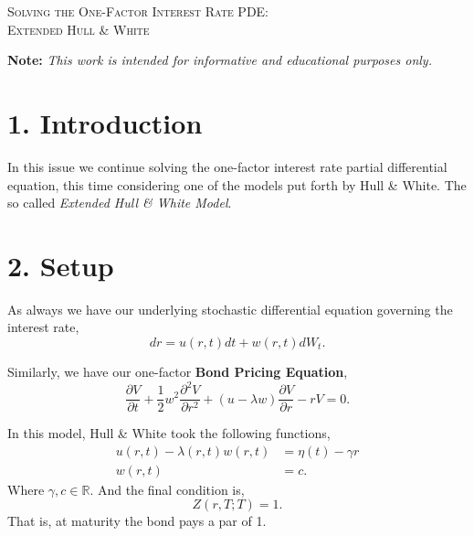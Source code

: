 \documentclass[11pt]{article}
\begin{document}

\begin{tcolorbox}
\begin{center}
    \large
    \textsc{Solving the One-Factor Interest Rate PDE: \\ Extended Hull \& White}
\end{center}
\end{tcolorbox}

\begin{center}
\textbf{Note:} \textit{This work is intended for informative and educational purposes only.}
\end{center}

\section*{1. Introduction}
In this issue we continue solving the one-factor interest rate partial differential equation, this time considering one of the models put forth by Hull \& White. The so called \textit{Extended Hull \& White Model}.

\section*{2. Setup}
As always we have our underlying stochastic differential equation governing the interest rate,
\begin{equation}
    dr = u(r,t)dt + w(r,t)dW_t.
\end{equation}

Similarly, we have our one-factor \textbf{Bond Pricing Equation},
\begin{equation}
    \frac{\partial V}{\partial t} + \frac{1}{2} w^2 \frac{\partial^2 V}{\partial r^2} + (u - \lambda w) \frac{\partial V}{\partial r} - rV = 0.
\end{equation}

In this model, Hull \& White took the following functions,
\begin{align}
    u(r,t) - \lambda(r,t) w(r,t) &= \eta(t) - \gamma r \\
    w(r,t) &= c.
\end{align}
Where $\gamma, c \in \mathbb{R}$. And the final condition is,
\begin{equation}
    Z(r,T;T) = 1.
\end{equation}
That is, at maturity the bond pays a par of 1.
\end{document}
